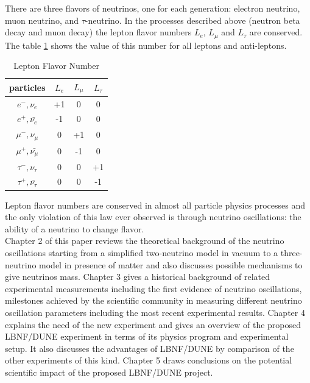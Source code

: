 There are three flavors of neutrinos, one for each generation: electron neutrino, muon neutrino, and $\tau$-neutrino. In the processes described above (neutron beta decay and muon decay) the lepton flavor numbers $L_e$, $L_{\mu}$ and $L_{\tau}$ are conserved. The table \ref{tab:LeptonFlavorNumber} shows the value of this number for all leptons and anti-leptons. 

\begin{table}[h]
  \begin{center}
  \caption{ Lepton Flavor Number}
  \begin{tabular}{|c|c|c|c|}
     particles & $L_e$ & $L_{\mu}$ & $L_{\tau}$ \\ \hline
     $e^-,\nu_e$ &  +1  &  0  &  0  \\ \hline 
     $e^+, \bar{\nu_e}$ &  -1  &  0  &  0  \\ \hline 
     $\mu^-,\nu_{\mu}$ &  0  &  +1  &  0  \\ \hline 
     $\mu^+, \bar{\nu_{\mu}}$ &  0  &  -1  &  0  \\ \hline 
     $\tau^-,\nu_{\tau}$ &  0  &  0  &  +1  \\ \hline 
     $\tau^+, \bar{\nu_{\tau}}$ &  0  &  0  &  -1  \\ \hline 
  \end{tabular}
  \label{tab:LeptonFlavorNumber}
  \end{center}
\end{table}

Lepton flavor numbers are conserved in almost all particle physics processes and the only violation of this law ever observed is through neutrino oscillations: the ability of a neutrino to change flavor.\\

Chapter 2 of this paper reviews the theoretical background of the neutrino oscillations starting from a simplified two-neutrino model in vacuum to a three-neutrino model in presence of matter and also discusses possible mechanisms to give neutrinos mass. Chapter 3 gives a historical background of related experimental measurements including the first evidence of neutrino oscillations, milestones achieved by the scientific community in measuring different neutrino oscillation parameters including the most recent experimental results. Chapter 4 explains the need of the new experiment and gives an overview of the proposed LBNF/DUNE experiment in terms of its physics program and experimental setup. It also discusses the advantages of LBNF/DUNE by comparison of the other experiments of this kind. Chapter 5 draws conclusions on the potential scientific impact of the proposed LBNF/DUNE project.  


